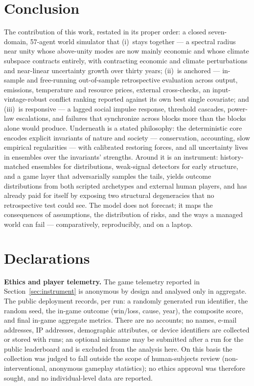 \documentclass[a4paper,fleqn]{cas-sc}
\begin{document}
\section{Conclusion}

The contribution of this work, restated in its proper order: a closed seven-domain,
57-agent world simulator that (i)~stays together --- a spectral radius near unity whose
above-unity modes are now mainly economic and whose climate subspace contracts entirely, with
contracting economic and climate perturbations and near-linear uncertainty growth over thirty
years; (ii)~is anchored --- in-sample and free-running out-of-sample retrospective evaluation
across output, emissions, temperature and resource prices, external cross-checks, an
input-vintage-robust conflict ranking reported against its own best single covariate; and
(iii)~is responsive --- a lagged social impulse response, threshold cascades, power-law
escalations, and failures that synchronize across blocks more than the blocks alone would
produce. Underneath is a stated philosophy: the
deterministic core encodes explicit invariants of nature and society --- conservation,
accounting, slow empirical regularities --- with calibrated restoring forces, and all
uncertainty lives in ensembles over the invariants' strengths. Around it is an instrument:
history-matched ensembles for distributions, weak-signal detectors for early structure, and a
game layer that adversarially samples the tails, yields outcome distributions from both
scripted archetypes and external human players, and has already paid for itself by exposing two
structural degeneracies that no retrospective test could see. The model does not forecast; it
maps the consequences of assumptions, the distribution of risks, and the ways a managed world
can fail --- comparatively, reproducibly, and on a laptop.

\section*{Declarations}

\textbf{Ethics and player telemetry.} The game telemetry reported in
Section~\ref{sec:instrument} is anonymous by design and analysed only in aggregate. The public
deployment records, per run: a randomly generated run identifier, the random seed, the in-game
outcome (win/loss, cause, year), the composite score, and final in-game aggregate metrics.
There are no accounts; no names, e-mail addresses, IP addresses, demographic attributes, or
device identifiers are collected or stored with runs; an optional nickname may be submitted
after a run for the public leaderboard and is excluded from the analysis here. On this basis
the collection was judged to fall outside the scope of human-subjects review (non-interventional,
anonymous gameplay statistics); no ethics approval was therefore sought, and no individual-level
data are reported.
\end{document}

